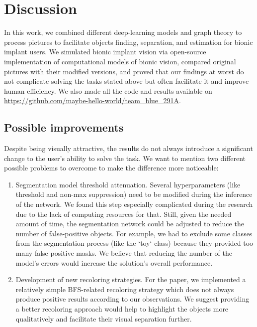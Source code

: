 \section{Discussion}

In this work, we combined different deep-learning models and graph theory to process pictures to facilitate objects finding, separation, and estimation for bionic implant users. We simulated bionic implant vision via open-source implementation of computational models of bionic vision, compared original pictures with their modified versions, and proved that our findings at worst do not complicate solving the tasks stated above but often facilitate it and improve human efficiency. We also made all the code and results available on \url{https://github.com/maybe-hello-world/team_blue_291A}.

\subsection{Possible improvements}

Despite being visually attractive, the results do not always introduce a significant change to the user's ability to solve the task. We want to mention two different possible problems to overcome to make the difference more noticeable:
\begin{enumerate}
    \item Segmentation model threshold attenuation. Several hyperparameters (like threshold and non-max suppression) need to be modified during the inference of the network. We found this step especially complicated during the research due to the lack of computing resources for that. Still, given the needed amount of time, the segmentation network could be adjusted to reduce the number of false-positive objects. For example, we had to exclude some classes from the segmentation process (like the `toy` class) because they provided too many false positive masks. We believe that reducing the number of the model's errors would increase the solution's overall performance.
    \item Development of new recoloring strategies. For the paper, we implemented a relatively simple BFS-related recoloring strategy which does not always produce positive results according to our observations. We suggest providing a better recoloring approach would help to highlight the objects more qualitatively and facilitate their visual separation further. 
\end{enumerate}

